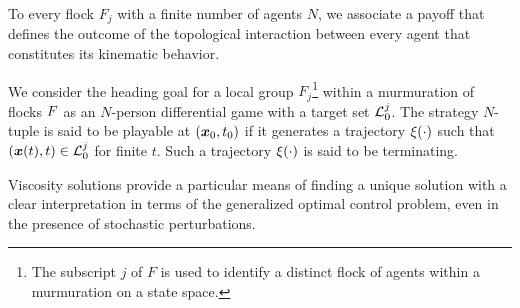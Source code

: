 
\begin{definition}
	To every flock $F_j$ with a finite number of agents $N$, we associate a payoff that defines the outcome of the  topological interaction between every agent that constitutes its kinematic behavior. %
	\label{def:payoff}
\end{definition}
%
%
\begin{definition}
	We consider the heading goal for a local group $F_j$\footnote{The subscript $j$ of $F$ is used to identify a distinct flock of agents within a murmuration on a state space.} within a murmuration of flocks $F$ as  an $N$-person differential game with a target set $\mathcal{L}_0^{j}$. The strategy $N$-tuple is said to be playable at $(\bm{x}_0, t_0)$ if it generates a trajectory $\xi(\cdot)$ such that $(\bm{x}(t), t) \in \mathcal{L}_0^{j}$ for finite $t$. Such a trajectory $\xi(\cdot)$ is said to be terminating.
\end{definition}
%
%
Viscosity solutions provide a particular means of finding a unique solution with a clear interpretation in terms of the generalized optimal control problem, even in the presence of stochastic perturbations. 
%
